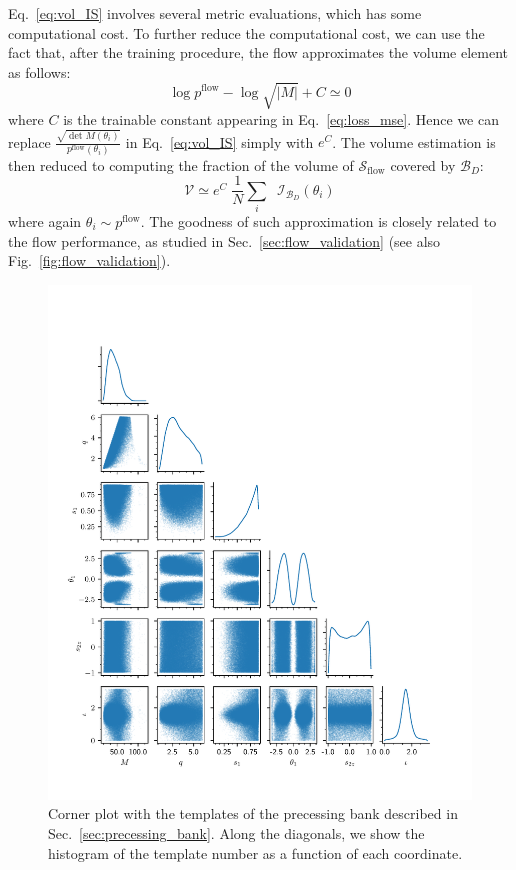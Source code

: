 \documentclass[twocolumn,showpacs,preprintnumbers,nofootinbib,prd,
superscriptaddress,10pt]{revtex4-2}
\begin{document}
Eq.~\eqref{eq:vol_IS} involves several metric evaluations, which has some computational cost.
To further reduce the computational cost, we can use the fact that, after the training procedure, the flow approximates the volume element as follows:
\begin{equation}
	\log p^\text{flow} - \log\sqrt{|M|} + C \simeq 0
\end{equation}
where $C$ is the trainable constant appearing in Eq.~\eqref{eq:loss_mse}.
Hence we can replace $\frac{\sqrt{\det M(\theta_i)}}{p^\text{flow}(\theta_i)}$ in Eq.~\eqref{eq:vol_IS} simply with $e^C$.
The volume estimation is then reduced to computing the fraction of the volume of $\mathcal{S}_\text{flow}$ covered by $\mathcal{B}_D$:
\begin{equation}
	\mathcal{V} \simeq e^C \; \frac{1}{N}  \sum_i \; \; \mathcal{I}_{\mathcal{B}_D}(\theta_i)
\end{equation}
where again $\theta_i \sim p^\text{flow}$.
The goodness of such approximation is closely related to the flow performance, as studied in Sec.~\ref{sec:flow_validation} (see also Fig.~\ref{fig:flow_validation}).

\begin{figure}
	\centering
	\includegraphics[scale = 1.]{corner_precessing}
	\caption{Corner plot with the templates of the precessing bank described in Sec.~\ref{sec:precessing_bank}. Along the diagonals, we show the histogram of the template number as a function of each coordinate.}
	\label{fig:corner_precessing}
\end{figure}
\end{document}
